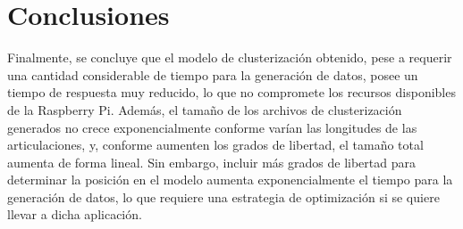 \section{Conclusiones}

Finalmente, se concluye que el modelo de clusterización obtenido, pese a requerir una cantidad considerable de tiempo para la generación de datos, posee un tiempo de respuesta muy reducido, lo que no compromete los recursos disponibles de la Raspberry Pi. Además, el tamaño de los archivos de clusterización generados no crece exponencialmente conforme varían las longitudes de las articulaciones, y, conforme aumenten los grados de libertad, el tamaño total aumenta de forma lineal. Sin embargo, incluir más grados de libertad para determinar la posición en el modelo aumenta exponencialmente el tiempo para la generación de datos, lo que requiere una estrategia de optimización si se quiere llevar a dicha aplicación.